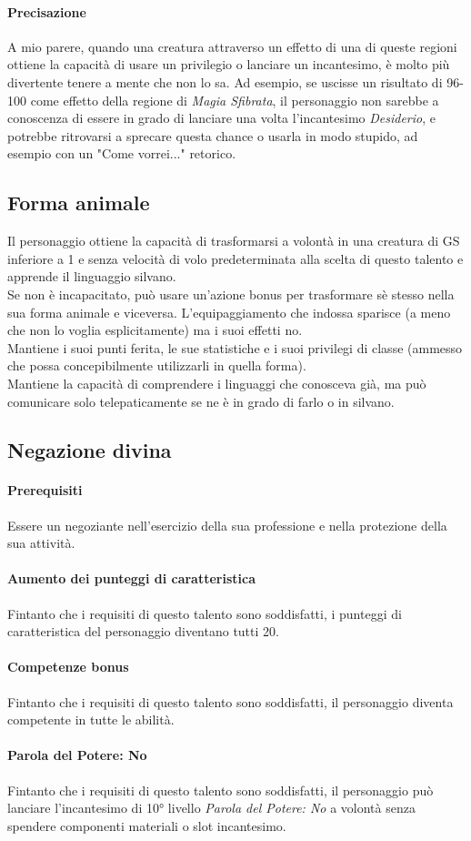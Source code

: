 \paragraph{Precisazione} A mio parere, quando una creatura attraverso un effetto di una di queste regioni ottiene la capacità di usare un privilegio o lanciare un incantesimo, è molto più divertente tenere a mente che non lo sa. Ad esempio, se uscisse un risultato di 96-100 come effetto della regione di \textit{Magia Sfibrata}, il personaggio non sarebbe a conoscenza di essere in grado di lanciare una volta l'incantesimo \textit{Desiderio}, e potrebbe ritrovarsi a sprecare questa chance o usarla in modo stupido, ad esempio con un "Come vorrei..." retorico.

\subsection{Forma animale}
Il personaggio ottiene la capacità di trasformarsi a volontà in una creatura di GS inferiore a 1 e senza velocità di volo predeterminata alla scelta di questo talento e apprende il linguaggio silvano.\\
Se non è incapacitato, può usare un'azione bonus per trasformare sè stesso nella sua forma animale e viceversa. L'equipaggiamento che indossa sparisce (a meno che non lo voglia esplicitamente) ma i suoi effetti no.\\
Mantiene i suoi punti ferita, le sue statistiche e i suoi privilegi di classe (ammesso che possa concepibilmente utilizzarli in quella forma).\\
Mantiene la capacità di comprendere i linguaggi che conosceva già, ma può comunicare solo telepaticamente se ne è in grado di farlo o in silvano.\\

\subsection{Negazione divina}
\paragraph{Prerequisiti}Essere un negoziante nell'esercizio della sua professione e nella protezione della sua attività.
\paragraph{Aumento dei punteggi di caratteristica} Fintanto che i requisiti di questo talento sono soddisfatti, i punteggi di caratteristica del personaggio diventano tutti 20.
\paragraph{Competenze bonus}Fintanto che i requisiti di questo talento sono soddisfatti, il personaggio diventa competente in tutte le abilità.
\paragraph{Parola del Potere: No}Fintanto che i requisiti di questo talento sono soddisfatti, il personaggio può lanciare l'incantesimo di 10° livello \textit{Parola del Potere: No} a volontà senza spendere componenti materiali o slot incantesimo.